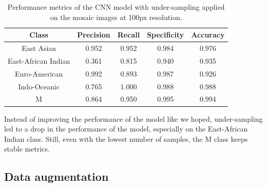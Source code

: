 \begin{table}[H]
	\centering
	\begin{tabular}{|c|c|c|c|c|}
		\hline
		\textbf{Class}      & \textbf{Precision} & \textbf{Recall} & \textbf{Specificity} & \textbf{Accuracy} \\
		\hline
		East Asian          & 0.952              & 0.952           & 0.984                & 0.976             \\
		East-African Indian & 0.361              & 0.815           & 0.940                & 0.935             \\
		Euro-American       & 0.992              & 0.893           & 0.987                & 0.926             \\
		Indo-Oceanic        & 0.765              & 1.000           & 0.988                & 0.988             \\
		M                   & 0.864              & 0.950           & 0.995                & 0.994             \\
		\hline
	\end{tabular}
	\caption{Performance metrics of the CNN model with under-sampling applied on the mosaic images at 100px resolution.}
	\label{tab:under_sampling_performance_metrics_mosaic}
\end{table}

Instead of improving the performance of the model like we hoped, under-sampling led to a drop in the performance of the model, especially
on the East-African Indian class. Still, even with the lowest number of samples, the M class keeps stable metrics.

\subsection{Data augmentation}
\label{subsec:data_augmentation}

\label{subsubsec:results_data_augmentation}

